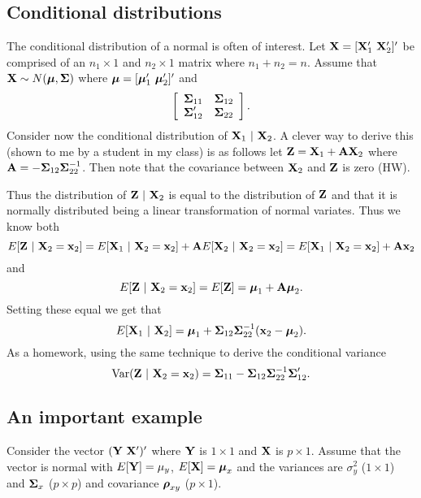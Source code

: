 \subsection{Conditional distributions}



%


The conditional distribution of a normal is often of interest.
Let $\mathbf{X} = [\mathbf{X}_1' ~ \mathbf{X}_2']'$ be comprised of an $n_1 \times 1$
and $n_2 \times 1$ matrix where $n_1 + n_2  = n$. Assume that
$\mathbf{X} \sim N(\boldsymbol{\mu}, \boldsymbol{\Sigma})$ where $\boldsymbol{\mu} = [\boldsymbol{\mu}_1' ~ \boldsymbol{\mu}_2']'$
and 
$$
\left[
\begin{array}{cc}
\boldsymbol{\Sigma}_{11} & \boldsymbol{\Sigma}_{12} \\
\boldsymbol{\Sigma}_{12}' & \boldsymbol{\Sigma}_{22}
\end{array}
\right].
$$
Consider now the conditional distribution of $\mathbf{X}_1 ~|~ \mathbf{X}_2$. 
A clever way to derive this (shown to me by a student in my class)
is as follows let $\mathbf{Z} = \mathbf{X}_1 + \mathbf{A} \mathbf{X}_2$
where $\mathbf{A} = - \boldsymbol{\Sigma}_{12}\boldsymbol{\Sigma}_{22}^{-1}$. Then note that
the covariance between $\mathbf{X}_2$ and $\mathbf{Z}$ is zero (HW).

Thus the distribution of $\mathbf{Z} ~|~ \mathbf{X}_2$ is equal
to the distribution of $\mathbf{Z}$ and that it is normally distributed
being a linear transformation of normal variates. Thus we know both
$$
E[\mathbf{Z} ~|~ \mathbf{X}_2 = \mathbf{x}_2] = E[\mathbf{X}_1 ~|~ \mathbf{X}_2 = \mathbf{x}_2] + \mathbf{A} E[\mathbf{X}_2 ~|~ \mathbf{X}_2 = \mathbf{x}_2]
= E[\mathbf{X}_1 ~|~ \mathbf{X}_2 = \mathbf{x}_2] + \mathbf{A} \mathbf{x}_2
$$
and
$$
E[\mathbf{Z} ~|~ \mathbf{X}_2 = \mathbf{x}_2] = E[\mathbf{Z}] = \boldsymbol{\mu}_1 + \mathbf{A} \boldsymbol{\mu}_2.
$$
Setting these equal we get that
$$
E[\mathbf{X}_1 ~|~ \mathbf{X}_2] = \boldsymbol{\mu}_1 + \boldsymbol{\Sigma}_{12}\boldsymbol{\Sigma}_{22}^{-1} (\mathbf{x}_2 - \boldsymbol{\mu}_2).
$$
As a homework, using the same technique to derive the conditional variance
$$
\mbox{Var}(\mathbf{Z} ~|~ \mathbf{X}_2 = \mathbf{x}_2) = \boldsymbol{\Sigma}_{11} - \boldsymbol{\Sigma}_{12} \boldsymbol{\Sigma}_{22}^{-1} \boldsymbol{\Sigma}_{12}'.
$$

\subsection{An important example}
Consider the vector 
$(\mathbf{Y} ~ \mathbf{X}')'$ where $\mathbf{Y}$ is $1\times 1$ and $\mathbf{X}$ is $p\times 1$. Assume that 
the vector is normal with $E[\mathbf{Y}] = \mu_y$, $E[\mathbf{X}] = \boldsymbol{\mu}_x$ and the variances
are $\sigma^2_y$ ($1\times 1$) and $\boldsymbol{\Sigma}_x$ ($p\times p$) 
and covariance $\boldsymbol{\rho}_{xy}$ ($p \times 1$).

